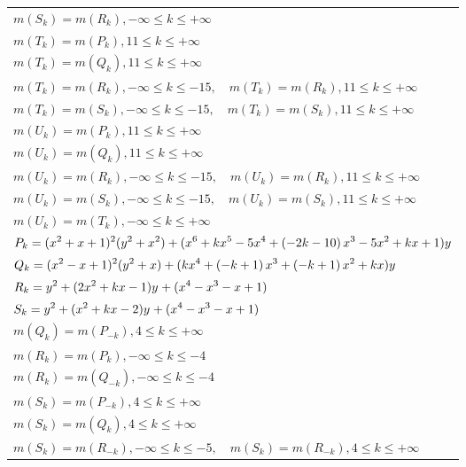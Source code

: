 \documentclass{amsart}
\begin{document}
\begin{longtable}{|l|}
\(\displaystyle m(S_k) = m(R_{k}),-\infty \leqslant k \leqslant +\infty\)\\
\(\displaystyle m(T_k) = m(P_{k}),11 \leqslant k \leqslant +\infty\)\\
\(\displaystyle m(T_k) = m(Q_{k}),11 \leqslant k \leqslant +\infty\)\\
\(\displaystyle m(T_k) = m(R_{k}),-\infty \leqslant k \leqslant -15,\quad m(T_k) = m(R_{k}),11 \leqslant k \leqslant +\infty\)\\
\(\displaystyle m(T_k) = m(S_{k}),-\infty \leqslant k \leqslant -15,\quad m(T_k) = m(S_{k}),11 \leqslant k \leqslant +\infty\)\\
\(\displaystyle m(U_k) = m(P_{k}),11 \leqslant k \leqslant +\infty\)\\
\(\displaystyle m(U_k) = m(Q_{k}),11 \leqslant k \leqslant +\infty\)\\
\(\displaystyle m(U_k) = m(R_{k}),-\infty \leqslant k \leqslant -15,\quad m(U_k) = m(R_{k}),11 \leqslant k \leqslant +\infty\)\\
\(\displaystyle m(U_k) = m(S_{k}),-\infty \leqslant k \leqslant -15,\quad m(U_k) = m(S_{k}),11 \leqslant k \leqslant +\infty\)\\
\(\displaystyle m(U_k) = m(T_{k}),-\infty \leqslant k \leqslant +\infty\)\\
\hline
\(\displaystyle P_k=(x^2
 + x
 + 1)^{2}(y^2+x^2)+(x^6
 + k\*x^5
 - 5\*x^4
 + \left(-2\*k
 - 10\right) \*x^3
 - 5\*x^2
 + k\*x
 + 1)y\)\\
\(\displaystyle Q_k=(x^2
 - x
 + 1)^{2}(y^2+x)+(k\*x^4
 + \left(-k
 + 1\right) \*x^3
 + \left(-k
 + 1\right) \*x^2
 + k\*x)y\)\\
\(\displaystyle R_k=y^{2}+(2\*x^2
 + k\*x
 - 1)y^{}+(x^4
 - x^3
 - x
 + 1)\)\\
\(\displaystyle S_k=y^{2}+(x^2
 + k\*x
 - 2)y^{}+(x^4
 - x^3
 - x
 + 1)\)\\
\(\displaystyle m(Q_k) = m(P_{-k}),4 \leqslant k \leqslant +\infty\)\\
\(\displaystyle m(R_k) = m(P_{k}),-\infty \leqslant k \leqslant -4\)\\
\(\displaystyle m(R_k) = m(Q_{-k}),-\infty \leqslant k \leqslant -4\)\\
\(\displaystyle m(S_k) = m(P_{-k}),4 \leqslant k \leqslant +\infty\)\\
\(\displaystyle m(S_k) = m(Q_{k}),4 \leqslant k \leqslant +\infty\)\\
\(\displaystyle m(S_k) = m(R_{-k}),-\infty \leqslant k \leqslant -5,\quad m(S_k) = m(R_{-k}),4 \leqslant k \leqslant +\infty\)\\

\end{longtable}
\end{document}
